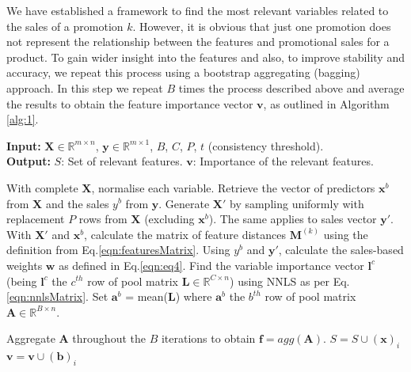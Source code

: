 \documentclass{ieeeaccess}
\begin{document}
We have established a framework to find the most relevant variables related to the sales of a promotion $k$. However, it is obvious that just one promotion does not represent the relationship between the features and promotional sales for a product. To gain wider insight into the features and also, to improve stability and accuracy, we repeat this process using a bootstrap aggregating (bagging) approach. In this step we repeat $B$ times  the process described above and average the results to obtain the feature importance vector $\mathbf{v}$, as outlined in Algorithm \ref{alg:1}.


\renewcommand{\algorithmiccomment}[1]{// #1}
\begin{algorithm}
\caption{Pseudo-code for Feature Selection: Bagging}
\label{alg:1}
\textbf{Input:} $\mathbf{X} \in \mathbb{R}^{m\times n}$, $\mathbf{y} \in \mathbb{R}^{m\times 1}$, $B$, $C$, $P$, $t$ (consistency threshold).\\
\textbf{Output:} $S$: Set of relevant features. $\mathbf{v}$: Importance of the relevant features.\\
\begin{algorithmic}[1] 
\State With complete $\mathbf{X}$, normalise each variable.
\State Retrieve the vector of predictors $\mathbf{x}^b$ from $\mathbf{X}$ and the sales $y^b$ from $\mathbf{y}$.
\State Generate $\mathbf{X'}$ by sampling uniformly with replacement $P$ rows from $\mathbf{X}$ (excluding $\mathbf{x}^b$). The same applies to sales vector $\mathbf{y'}$.
\State With $\mathbf{X'}$ and $\mathbf{x}^b$, calculate the matrix of feature distances $\mathbf{M}^{(k)}$ using the definition from Eq.\eqref{eqn:featuresMatrix}.
\State Using $y^b$ and $\mathbf{y'}$, calculate the sales-based weights $\mathbf{w}$ as defined in Eq.\eqref{eqn:eq4}.
\State Find the variable importance vector $\mathbf{l}^c$ (being $\mathbf{l}^c$ the $c^{th}$ row of pool matrix $\mathbf{L} \in \mathbb{R}^{C\times n}$) using NNLS as per Eq.\eqref{eqn:nnlsMatrix}.
\EndFor
\State Set $\mathbf{a}^b$ = mean($\mathbf{L}$) where  $\mathbf{a}^b$ the $b^{th}$ row of pool matrix $\mathbf{A} \in \mathbb{R}^{B\times n}$.
\EndFor

\State Aggregate $\mathbf{A}$ throughout the $B$ iterations to obtain $\mathbf{f} = agg(\mathbf{A})$.
\State $S = S \cup (\mathbf x)_ i$
\State $\mathbf{v} = \mathbf{v} \cup (\mathbf b)_ i$
 \EndIf
\EndFor
\end{algorithmic}
\end{algorithm}
\end{document}
